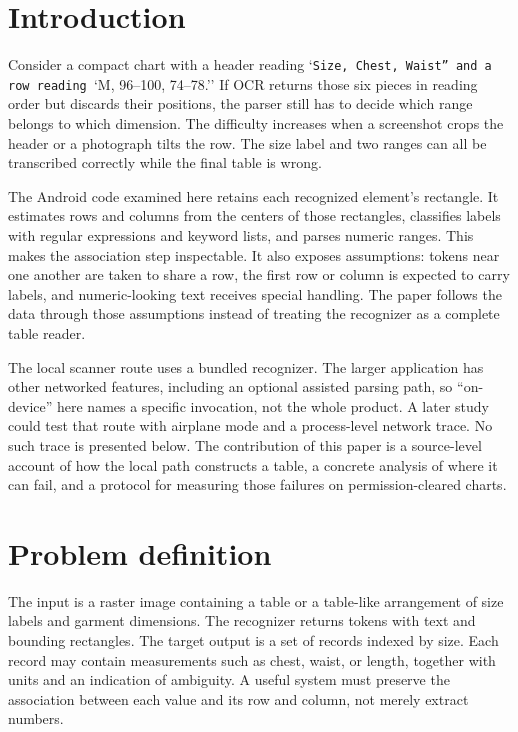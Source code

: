 \documentclass[10pt,letterpaper]{article}
\begin{document}
\vspace{0.8em}

\section{Introduction}

Consider a compact chart with a header reading `\texttt{Size, Chest, Waist'' and a row reading }`M, 96--100, 74--78.'' If OCR returns those six pieces in reading order but discards their positions, the parser still has to decide which range belongs to which dimension. The difficulty increases when a screenshot crops the header or a photograph tilts the row. The size label and two ranges can all be transcribed correctly while the final table is wrong.

The Android code examined here retains each recognized element's rectangle. It estimates rows and columns from the centers of those rectangles, classifies labels with regular expressions and keyword lists, and parses numeric ranges. This makes the association step inspectable. It also exposes assumptions: tokens near one another are taken to share a row, the first row or column is expected to carry labels, and numeric-looking text receives special handling. The paper follows the data through those assumptions instead of treating the recognizer as a complete table reader.

The local scanner route uses a bundled recognizer. The larger application has other networked features, including an optional assisted parsing path, so ``on-device'' here names a specific invocation, not the whole product. A later study could test that route with airplane mode and a process-level network trace. No such trace is presented below. The contribution of this paper is a source-level account of how the local path constructs a table, a concrete analysis of where it can fail, and a protocol for measuring those failures on permission-cleared charts.

\section{Problem definition}

The input is a raster image containing a table or a table-like arrangement of size labels and garment dimensions. The recognizer returns tokens with text and bounding rectangles. The target output is a set of records indexed by size. Each record may contain measurements such as chest, waist, or length, together with units and an indication of ambiguity. A useful system must preserve the association between each value and its row and column, not merely extract numbers.
\end{document}
